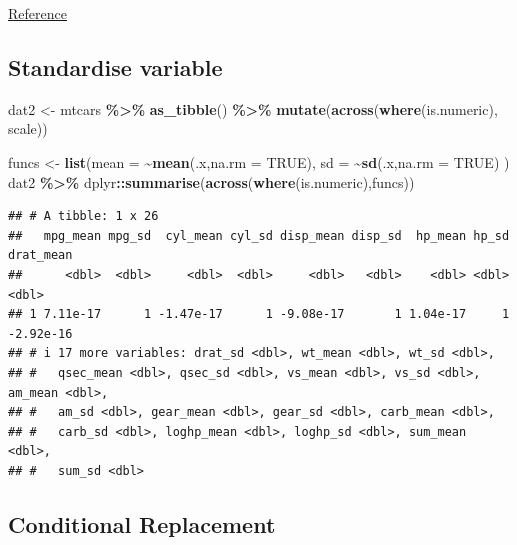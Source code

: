 \documentclass[
]{article}
\newenvironment{Shaded}{\begin{snugshade}}{\end{snugshade}}
\newcommand{\AttributeTok}[1]{\textcolor[rgb]{0.13,0.29,0.53}{#1}}
\newcommand{\ConstantTok}[1]{\textcolor[rgb]{0.56,0.35,0.01}{#1}}
\newcommand{\FunctionTok}[1]{\textcolor[rgb]{0.13,0.29,0.53}{\textbf{#1}}}
\newcommand{\NormalTok}[1]{#1}
\newcommand{\OtherTok}[1]{\textcolor[rgb]{0.56,0.35,0.01}{#1}}
\newcommand{\SpecialCharTok}[1]{\textcolor[rgb]{0.81,0.36,0.00}{\textbf{#1}}}
\begin{document}
\href{https://stackoverflow.com/questions/28873057/sum-across-multiple-columns-with-dplyr}{Reference}

\hypertarget{standardise-variable}{%
\subsection{Standardise variable}\label{standardise-variable}}

\begin{Shaded}
\begin{Highlighting}[]
\NormalTok{dat2 }\OtherTok{\textless{}{-}}\NormalTok{ mtcars }\SpecialCharTok{\%\textgreater{}\%}
    \FunctionTok{as\_tibble}\NormalTok{() }\SpecialCharTok{\%\textgreater{}\%}
    \FunctionTok{mutate}\NormalTok{(}\FunctionTok{across}\NormalTok{(}\FunctionTok{where}\NormalTok{(is.numeric), scale))}

\NormalTok{funcs }\OtherTok{\textless{}{-}} \FunctionTok{list}\NormalTok{(}\AttributeTok{mean =} \SpecialCharTok{\textasciitilde{}}\FunctionTok{mean}\NormalTok{(.x,}\AttributeTok{na.rm =} \ConstantTok{TRUE}\NormalTok{), }
  \AttributeTok{sd =} \SpecialCharTok{\textasciitilde{}}\FunctionTok{sd}\NormalTok{(.x,}\AttributeTok{na.rm =} \ConstantTok{TRUE}\NormalTok{)}
\NormalTok{)}
\NormalTok{dat2 }\SpecialCharTok{\%\textgreater{}\%}\NormalTok{ dplyr}\SpecialCharTok{::}\FunctionTok{summarise}\NormalTok{(}\FunctionTok{across}\NormalTok{(}\FunctionTok{where}\NormalTok{(is.numeric),funcs))}
\end{Highlighting}
\end{Shaded}

\begin{verbatim}
## # A tibble: 1 x 26
##   mpg_mean mpg_sd  cyl_mean cyl_sd disp_mean disp_sd  hp_mean hp_sd drat_mean
##      <dbl>  <dbl>     <dbl>  <dbl>     <dbl>   <dbl>    <dbl> <dbl>     <dbl>
## 1 7.11e-17      1 -1.47e-17      1 -9.08e-17       1 1.04e-17     1 -2.92e-16
## # i 17 more variables: drat_sd <dbl>, wt_mean <dbl>, wt_sd <dbl>,
## #   qsec_mean <dbl>, qsec_sd <dbl>, vs_mean <dbl>, vs_sd <dbl>, am_mean <dbl>,
## #   am_sd <dbl>, gear_mean <dbl>, gear_sd <dbl>, carb_mean <dbl>,
## #   carb_sd <dbl>, loghp_mean <dbl>, loghp_sd <dbl>, sum_mean <dbl>,
## #   sum_sd <dbl>
\end{verbatim}

\hypertarget{conditional-replacement}{%
\subsection{Conditional Replacement}\label{conditional-replacement}}
\end{document}
